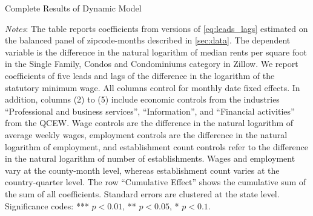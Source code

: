 \clearpage
\begin{table}[h!]
	\caption{Complete Results of Dynamic Model}
	\label{tab:dynamic_lags_leads_main}
	\centering
	
	\begin{minipage}{0.95\textwidth} \footnotesize
		\vspace{3mm} 
		\textit{Notes}: The table reports coefficients from versions of 
		\autoref{eq:leads_lags} estimated on the balanced panel of zipcode-months
		described in \autoref{sec:data}. The dependent variable is the difference in 
		the natural logarithm of median	rents per square foot in the Single Family, Condos 
		and Condominiums category in Zillow. We report coefficients of five leads and lags 
		of the difference in the logarithm of the statutory minimum wage. All columns 
		control for monthly date fixed effects. In addition, columns (2) to (5) include 
		economic controls from the industries ``Professional and business services'', 
		``Information'', and ``Financial activities'' from the QCEW. Wage controls are 
		the difference in the natural logarithm of average weekly wages, employment 
		controls are the difference in the natural logarithm of employment, and 
		establishment count controls refer to the difference in the natural logarithm 
		of number of establishments. Wages and employment vary at the county-month level,
		whereas establishment count varies at the country-quarter level. The row 
		``Cumulative Effect'' shows the cumulative 	sum of the sum of all coefficients. 
		Standard errors are clustered at the state level. Significance codes: *** $p < 
		0.01$, ** $p < 0.05$, * $p < 0.1$.
	\end{minipage}
\end{table}

